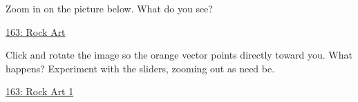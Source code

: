 \documentclass{ximera}
\begin{document}
\begin{exploration}
Zoom in on the picture below. What do you see?
\begin{onlineOnly}
    \begin{center}
\end{center}
\end{onlineOnly}

\href{https://www.desmos.com/calculator/awoec8d6pq}{163: Rock Art}
\end{exploration}


\begin{exploration}
Click and rotate the image so the orange vector points directly toward you. What happens? Experiment with the sliders, zooming out as need be.
\begin{onlineOnly}
    \begin{center}
\end{center}
\end{onlineOnly}

\href{https://www.desmos.com/3d/9g2timus2m}{163: Rock Art 1}
\end{exploration}
\end{document}

